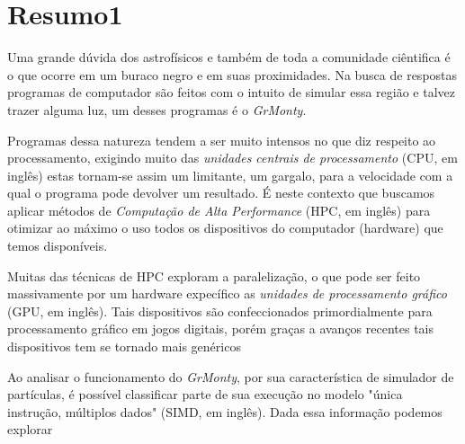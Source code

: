 \chapter{Resumo1}
\label{cap:resumo2}

Uma grande dúvida dos astrofísicos e também de toda a comunidade ciêntifica é o que ocorre em um buraco negro e em suas proximidades. Na busca de respostas programas de computador são feitos com o intuito de simular essa região e talvez trazer alguma luz, um desses programas é o \emph{GrMonty}.

Programas dessa natureza tendem a ser muito intensos no que diz respeito ao processamento, exigindo muito das \emph{unidades centrais de processamento} (CPU, em inglês) estas tornam-se assim um limitante, um gargalo, para a velocidade com a qual o programa pode devolver um resultado. É neste contexto que buscamos aplicar métodos de \emph{Computação de Alta Performance} (HPC, em inglês) para otimizar ao máximo o uso todos os dispositivos do computador (hardware) que temos disponíveis.

Muitas das técnicas de HPC exploram a paralelização, o que pode ser feito massivamente por um hardware expecífico as \emph{unidades de processamento gráfico} (GPU, em inglês). Tais dispositivos são confeccionados primordialmente para processamento gráfico em jogos digitais, porém graças a avanços recentes tais dispositivos tem se tornado mais genéricos

Ao analisar o funcionamento do \emph{GrMonty}, por sua característica de simulador de partículas, é possível classificar parte de sua execução no modelo "única instrução, múltiplos dados" (SIMD, em inglês). Dada essa informação podemos explorar
